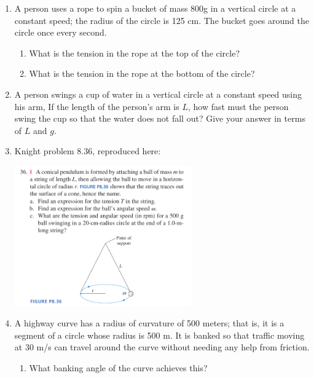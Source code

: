 \documentclass[12pt]{article}
\begin{document}
\Large
\centerline{}
\normalsize
\centerline{}

\begin{enumerate}



\begin{enumerate}
  \item{A person uses a rope to spin a bucket of mass 800g in a vertical circle at a constant speed; the radius of the circle is 125 cm. The bucket goes around the circle once every second.}
    \begin{enumerate}
      \item{What is the tension in the rope at the top of the circle?}
      \item{What is the tension in the rope at the bottom of the circle?}
    \end{enumerate}

  \item{A person swings a cup of water in a vertical circle at a constant speed using his arm, If the length of the person's arm is $L$, how fast must the person swing the cup so that the water does not fall out? Give your answer in terms of $L$ and $g$.}

  \item{Knight problem 8.36, reproduced here:\\}
    \centerline{\includegraphics[width=0.6\textwidth]{conical-pendulum.png}}

  \item{A highway curve has a radius of curvature of 500 meters; that is, it is a segment of a circle whose radius is 500 m. It is banked so that traffic moving at 30 m/s can travel
  around the curve without needing any help from friction.}

\begin{enumerate}
  
  \item{What banking angle of the curve achieves this?}


\end{enumerate}
\end{enumerate}
\end{enumerate}
\end{document}
